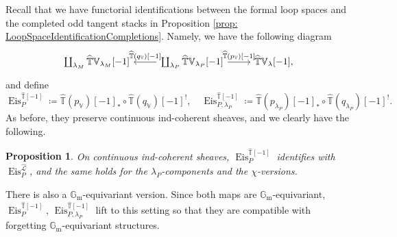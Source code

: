 \documentclass{amsart}
\newtheorem{proposition}[theorem]{Proposition}
\theoremstyle{definition}
\theoremstyle{remark}
\numberwithin{equation}{section}
\newcommand{\mc}{\mathcal}
\newcommand{\Gm}{{\mathbb{G}_{\mathrm{m}}}}
\newcommand{\wh}{\widehat}
\DeclareMathOperator{\Eis}{\mathrm{Eis}}
\newcommand{\V}{\mathbb{V}}
\newcommand{\T}{\mathbb{T}}
\begin{document}
Recall that we have functorial identifications between the formal loop spaces and the completed odd tangent stacks in Proposition \ref{prop: LoopSpaceIdentificationCompletions}. Namely, we have the following diagram
\[
\begin{tikzcd}
\coprod_{\lambda_M} \wh{\T}\V_{\lambda_M}[-1]
& \coprod_{\lambda_P} \wh{\T}\V_{\lambda_P}[-1]
\arrow[l, "{\wh{\T}(q_\V)[-1]}"']
\arrow[r, "{\wh{\T}(p_\V)[-1]}"]
& \wh{\T}\V_{\lambda}[-1], 
\end{tikzcd}
\]
and define
\[
\Eis_{P}^{\wh{\T}[-1]}\coloneq \wh{\T}(p_\V)[-1]_*  \circ \wh{\T}(q_\V)[-1]^!, \quad
\Eis_{P, \lambda_P}^{\wh{\T}[-1]}\coloneq \wh{\T}(p_{\lambda_P})[-1]_*  \circ \wh{\T}(q_{\lambda_P})[-1]^!.
\]
As before, they preserve continuous ind-coherent sheaves, and we clearly have the following.

\begin{proposition}{\label{prop: loopvstangentEis}}
On continuous ind-coherent sheaves, $\Eis_{P}^{\wh{\T}[-1]}$ identifies with $\Eis_{P}^{ \wh{\mc{L}}}$, and the same holds for the $\lambda_P$-components and the $\chi$-versions.
\end{proposition}

There is also a $\Gm$-equivariant version. Since both maps are $\Gm$-equivariant, $\Eis^{\wh{\T}[-1]}_{P}$, $\Eis_{P, \lambda_P}^{\wh{\T}[-1]}$ lift to this setting so that they are compatible with forgetting $\Gm$-equivariant structures. 
\end{document}
